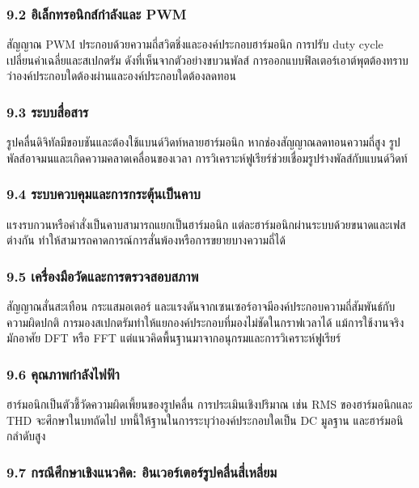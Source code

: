 \subsubsection{9.2 อิเล็กทรอนิกส์กำลังและ PWM}

สัญญาณ PWM ประกอบด้วยความถี่สวิตชิ่งและองค์ประกอบฮาร์มอนิก การปรับ duty cycle เปลี่ยนค่าเฉลี่ยและสเปกตรัม ดังที่เห็นจากตัวอย่างขบวนพัลส์ การออกแบบฟิลเตอร์เอาต์พุตต้องทราบว่าองค์ประกอบใดต้องผ่านและองค์ประกอบใดต้องลดทอน

\subsubsection{9.3 ระบบสื่อสาร}

รูปคลื่นดิจิทัลมีขอบชันและต้องใช้แบนด์วิดท์หลายฮาร์มอนิก หากช่องสัญญาณลดทอนความถี่สูง รูปพัลส์อาจมนและเกิดความคลาดเคลื่อนของเวลา การวิเคราะห์ฟูเรียร์ช่วยเชื่อมรูปร่างพัลส์กับแบนด์วิดท์

\subsubsection{9.4 ระบบควบคุมและการกระตุ้นเป็นคาบ}

แรงรบกวนหรือคำสั่งเป็นคาบสามารถแยกเป็นฮาร์มอนิก แต่ละฮาร์มอนิกผ่านระบบด้วยขนาดและเฟสต่างกัน ทำให้สามารถคาดการณ์การสั่นพ้องหรือการขยายบางความถี่ได้

\subsubsection{9.5 เครื่องมือวัดและการตรวจสอบสภาพ}

สัญญาณสั่นสะเทือน กระแสมอเตอร์ และแรงดันจากเซนเซอร์อาจมีองค์ประกอบความถี่สัมพันธ์กับความผิดปกติ การมองสเปกตรัมทำให้แยกองค์ประกอบที่มองไม่ชัดในกราฟเวลาได้ แม้การใช้งานจริงมักอาศัย DFT หรือ FFT แต่แนวคิดพื้นฐานมาจากอนุกรมและการวิเคราะห์ฟูเรียร์

\subsubsection{9.6 คุณภาพกำลังไฟฟ้า}

ฮาร์มอนิกเป็นตัวชี้วัดความผิดเพี้ยนของรูปคลื่น การประเมินเชิงปริมาณ เช่น RMS ของฮาร์มอนิกและ THD จะศึกษาในบทถัดไป บทนี้ให้ฐานในการระบุว่าองค์ประกอบใดเป็น DC มูลฐาน และฮาร์มอนิกลำดับสูง

\subsubsection{9.7 กรณีศึกษาเชิงแนวคิด: อินเวอร์เตอร์รูปคลื่นสี่เหลี่ยม}

